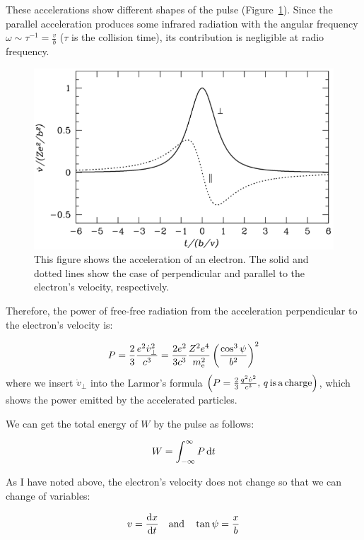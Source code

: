 These accelerations show different shapes of the pulse (Figure~\ref{fig:nrao_radio4n3}).
Since the parallel acceleration produces some infrared radiation with the angular frequency $\omega \sim \tau^{-1} = \frac{v}{b}$ ($\tau$ is the collision time), its contribution is negligible at radio frequency.

\begin{figure}[htbp]
\centering
	\includegraphics[width=.7\linewidth]{Chapter_2/Figures/NRAO_radio4n3.png}
    \caption[The acceleration of an electron by an ion]{\label{fig:nrao_radio4n3}
        This figure shows the acceleration of an electron.
        The solid and dotted lines show the case of perpendicular and parallel to the electron's velocity, respectively.
    }
\end{figure}

Therefore, the power of free-free radiation from the acceleration perpendicular to the electron's velocity is:

\begin{equation}\label{eq:essential_radio4n17}
    P=\frac{2}{3} \frac{e^{2} \dot{v}_{\perp}^{2}}{c^{3}}=\frac{2 e^{2}}{3 c^{3}} \frac{Z^{2} e^{4}}{m_{\mathrm{e}}^{2}}\left(\frac{\cos ^{3} \psi}{b^{2}}\right)^{2}
\end{equation}
where we insert $\dot{v}_{\perp}$ into the Larmor's formula $\left(P = \frac{2}{3}\frac{q^2\dot{v}^2}{c^3},\,q\,\mathrm{is\,a\,charge}\right)$, which shows the power emitted by the accelerated particles.

We can get the total energy of $W$ by the pulse as follows:

\begin{equation}\label{eq:essential_radio4n18}
    W = \int^{\infty}_{-\infty} P\,\mathrm{d}t
\end{equation}

As I have noted above, the electron's velocity does not change so that we can change of variables:

\begin{equation}\label{eq:essential_radio4n19}
    v = \frac{\mathrm{d} x}{\mathrm{d} t}\ \ \ \mathrm{and}\ \ \ \tan\psi = \frac{x}{b}
\end{equation}

